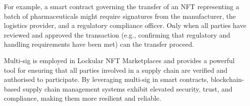 \documentclass{tufte-handout}
\begin{document}
For example, a smart contract governing the transfer of an NFT representing a batch of pharmaceuticals might require signatures from the manufacturer,
the logistics provider, and a regulatory compliance officer. Only when all parties have reviewed and approved the transaction (e.g., confirming that
regulatory and handling requirements have been met) can the transfer proceed.


Multi-sig is employed in Lockular NFT Marketplaces and provides a powerful tool for ensuring that all parties involved in a supply chain are verified
and authorised to participate. By leveraging multi-sig in smart contracts, blockchain-based supply chain management systems exhibit elevated security, trust,
and compliance, making them more resilient and reliable.


\end{document}
